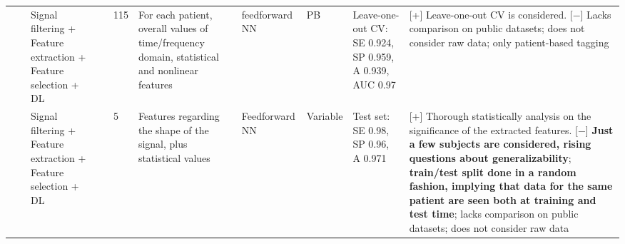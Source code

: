 \documentclass[5p,twocolumn,lefttitle]{elsarticle}
\begin{document}
\begin{table*}[t]
{\begin{tabularx}{2\textwidth}{@{}m{2.5em}p{7em}p{10em}lp{2em}p{12em}p{7em}p{3em}p{17em}X@{}}
                            &                                                         & Signal filtering + Feature extraction + Feature selection + DL & \cite{morillo2013probabilistic}          & 115           & For each patient, overall values of time/frequency domain, statistical and nonlinear features                     & feedforward NN                      & PB                                & Leave-one-out CV: SE 0.924, SP 0.959, A 0.939, AUC 0.97                                                                                                                                 & [+] Leave-one-out CV is considered. [$-$] Lacks comparison on public datasets; does not consider raw data; only patient-based tagging                                                                                                                                                                                                                                                                                                                                                \\
                    \cmidrule(l){3-10} 
                            &                                                         & Signal filtering + Feature extraction + Feature selection + DL & \cite{DBLP:journals/nca/UcarBBP17}       & 5             & Features regarding the shape of the signal, plus statistical values                                               & Feedforward NN                      & Variable & Test set: SE 0.98, SP 0.96, A 0.971                                                                                                                                                       & [+] Thorough statistically analysis on the significance of the extracted features. [$-$] \textbf{Just a few subjects are considered, rising questions about generalizability}; \textbf{train/test split done in a random fashion, implying that data for the same patient are seen both at training and test time}; lacks comparison on public datasets; does not consider raw data                                \\
                    \cmidrule(l){3-10} 

\end{tabularx}}
\end{table*}
\end{document}
